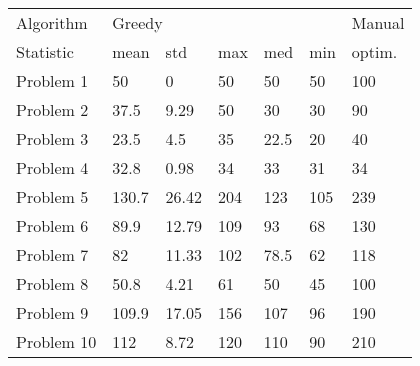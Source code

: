 \begin{tabular}{lllllll}
\toprule
Algorithm & \multicolumn{5}{l}{Greedy} & Manual \\
Statistic &   mean &    std &  max &   med &  min & optim. \\
\midrule
Problem 1  &     50 &      0 &   50 &    50 &   50 &    100 \\
Problem 2  &   37.5 &   9.29 &   50 &    30 &   30 &     90 \\
Problem 3  &   23.5 &    4.5 &   35 &  22.5 &   20 &     40 \\
Problem 4  &   32.8 &   0.98 &   34 &    33 &   31 &     34 \\
Problem 5  &  130.7 &  26.42 &  204 &   123 &  105 &    239 \\
Problem 6  &   89.9 &  12.79 &  109 &    93 &   68 &    130 \\
Problem 7  &     82 &  11.33 &  102 &  78.5 &   62 &    118 \\
Problem 8  &   50.8 &   4.21 &   61 &    50 &   45 &    100 \\
Problem 9  &  109.9 &  17.05 &  156 &   107 &   96 &    190 \\
Problem 10 &    112 &   8.72 &  120 &   110 &   90 &    210 \\
\bottomrule
\end{tabular}
